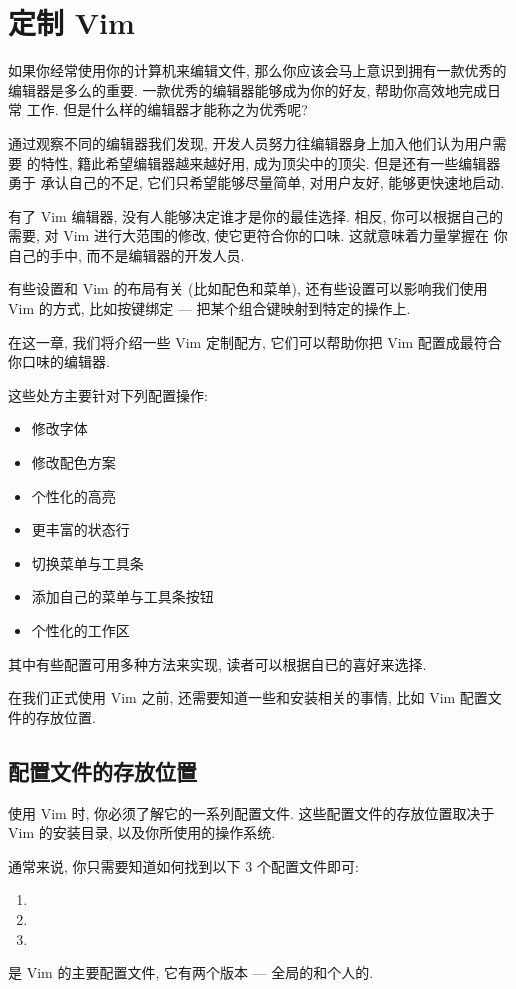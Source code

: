 \chapter{定制 Vim}
\label{chap:personalizing_vim}
如果你经常使用你的计算机来编辑文件, 那么你应该会马上意识到拥有一款优秀的
编辑器是多么的重要. 一款优秀的编辑器能够成为你的好友, 帮助你高效地完成日常
工作. 但是什么样的编辑器才能称之为优秀呢?

通过观察不同的编辑器我们发现, 开发人员努力往编辑器身上加入他们认为用户需要
的特性, 籍此希望编辑器越来越好用, 成为顶尖中的顶尖.  但是还有一些编辑器勇于
承认自己的不足, 它们只希望能够尽量简单, 对用户友好, 能够更快速地启动.

有了 Vim 编辑器, 没有人能够决定谁才是你的最佳选择. 相反, 你可以根据自己的
需要, 对 Vim 进行大范围的修改, 使它更符合你的口味. 这就意味着力量掌握在
你自己的手中, 而不是编辑器的开发人员.

有些设置和 Vim 的布局有关 (比如配色和菜单), 还有些设置可以影响我们使用
Vim 的方式, 比如按键绑定 --- 把某个组合键映射到特定的操作上.

在这一章, 我们将介绍一些 Vim 定制配方, 它们可以帮助你把 Vim 配置成最符合
你口味的编辑器.

这些处方主要针对下列配置操作:
\begin{itemize}
    \item 修改字体
    \item 修改配色方案
    \item 个性化的高亮
    \item 更丰富的状态行
    \item 切换菜单与工具条
    \item 添加自己的菜单与工具条按钮
    \item 个性化的工作区
\end{itemize}
其中有些配置可用多种方法来实现, 读者可以根据自已的喜好来选择.

在我们正式使用 Vim 之前, 还需要知道一些和安装相关的事情, 比如 Vim
配置文件的存放位置.

\section{配置文件的存放位置}
\label{sec:where_the_configuration_files}
使用 Vim 时, 你必须了解它的一系列配置文件. 这些配置文件的存放位置取决于
Vim 的安装目录, 以及你所使用的操作系统.

通常来说, 你只需要知道如何找到以下 3 个配置文件即可:
\begin{enumerate}
    \item {}
    \item {}
    \item {}
\end{enumerate}
 是 Vim 的主要配置文件, 它有两个版本 --- 全局的和个人的.

